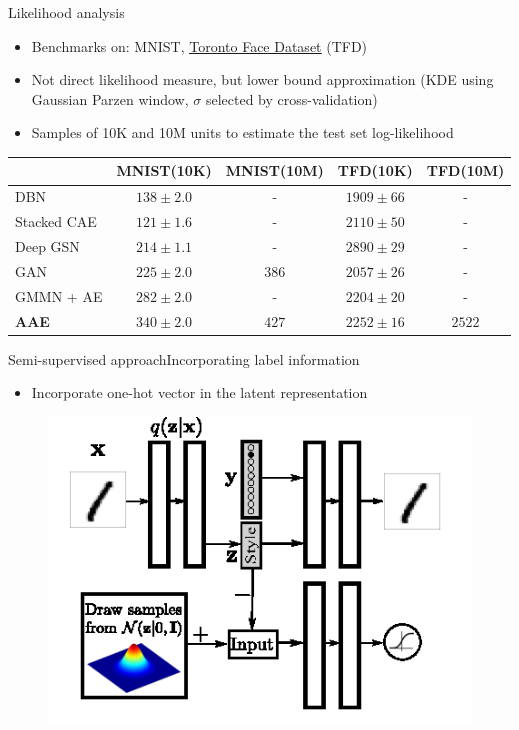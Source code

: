 \documentclass[10pt]{beamer}
\begin{document}
\begin{frame}{Likelihood analysis}
\begin{itemize}
  \item Benchmarks on: MNIST, \href{../images/tfd.gif}{\underline{Toronto Face Dataset}} (TFD)
  \item Not direct likelihood measure, but lower bound approximation (KDE using Gaussian Parzen window, $ \sigma $ selected by cross-validation)
  \item Samples of 10K and 10M units to estimate the test set log-likelihood
\end{itemize}
\begin{table}
  \centering
  \small
  \begin{tabular}{l||c||c||c||c}
  	\toprule
  	             &   MNIST(10K)    & MNIST(10M) &    TFD(10K)     & TFD(10M) \\ \midrule
  	DBN          & $ 138 \pm 2.0 $ &     -      & $ 1909 \pm 66 $ &    -     \\
  	Stacked CAE  & $ 121 \pm 1.6 $ &     -      & $ 2110 \pm 50 $ &    -     \\
  	Deep GSN     & $ 214 \pm 1.1 $ &     -      & $ 2890 \pm 29 $ &    -     \\
  	GAN          & $ 225 \pm 2.0 $ &  $ 386 $   & $ 2057 \pm 26 $ &    -     \\
  	GMMN + AE    & $ 282 \pm 2.0 $ &     -      & $ 2204 \pm 20 $ &    -     \\ \midrule
  	\textbf{AAE} & $ 340 \pm 2.0 $ &  $ 427 $   & $ 2252 \pm 16 $ & $ 2522 $ \\ \bottomrule
  \end{tabular}
\end{table}
\end{frame}

\begin{frame}{Semi-supervised approach}{Incorporating label information}
\begin{itemize}
  \item Incorporate one-hot vector in the latent representation
\end{itemize}
\begin{figure}
  \centering
  \includegraphics[width=0.6\linewidth]{../images/aae-architecture-02.png}
\end{figure}
\end{frame}
\end{document}
